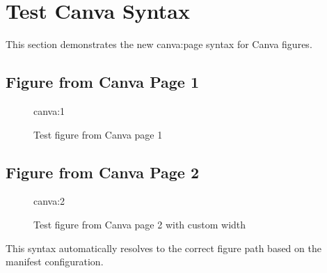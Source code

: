\section{Test Canva Syntax}

This section demonstrates the new {{canva:page}} syntax for Canva figures.

\subsection{Figure from Canva Page 1}

\begin{figure}[ht!]
    \centering
    {{canva:1}}
    \caption{Test figure from Canva page 1}
    \label{fig:canva-test-1}
\end{figure}

\subsection{Figure from Canva Page 2}

\begin{figure}[ht!]
    \centering
    {{canva:2}}
    \caption{Test figure from Canva page 2 with custom width}
    \label{fig:canva-test-2}
\end{figure}

This syntax automatically resolves to the correct figure path based on the manifest configuration.

